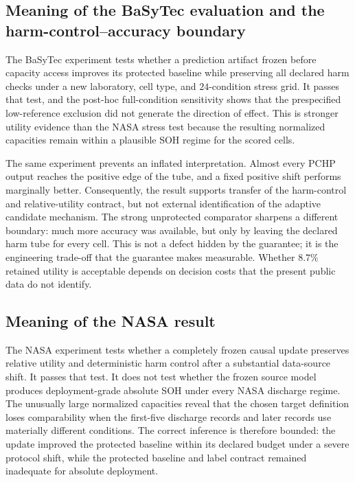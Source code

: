 \documentclass[11pt]{article}
\begin{document}
\subsection{Meaning of the BaSyTec evaluation and the harm-control--accuracy boundary}

The BaSyTec experiment tests whether a prediction artifact frozen before capacity access improves its protected baseline while preserving all declared harm checks under a new laboratory, cell type, and $24$-condition stress grid. It passes that test, and the post-hoc full-condition sensitivity shows that the prespecified low-reference exclusion did not generate the direction of effect. This is stronger utility evidence than the NASA stress test because the resulting normalized capacities remain within a plausible SOH regime for the scored cells.

The same experiment prevents an inflated interpretation. Almost every PCHP output reaches the positive edge of the tube, and a fixed positive shift performs marginally better. Consequently, the result supports transfer of the harm-control and relative-utility contract, but not external identification of the adaptive candidate mechanism. The strong unprotected comparator sharpens a different boundary: much more accuracy was available, but only by leaving the declared harm tube for every cell. This is not a defect hidden by the guarantee; it is the engineering trade-off that the guarantee makes measurable. Whether $8.7\%$ retained utility is acceptable depends on decision costs that the present public data do not identify.

\subsection{Meaning of the NASA result}

The NASA experiment tests whether a completely frozen causal update preserves relative utility and deterministic harm control after a substantial data-source shift. It passes that test. It does not test whether the frozen source model produces deployment-grade absolute SOH under every NASA discharge regime. The unusually large normalized capacities reveal that the chosen target definition loses comparability when the first-five discharge records and later records use materially different conditions. The correct inference is therefore bounded: the update improved the protected baseline within its declared budget under a severe protocol shift, while the protected baseline and label contract remained inadequate for absolute deployment.
\end{document}
